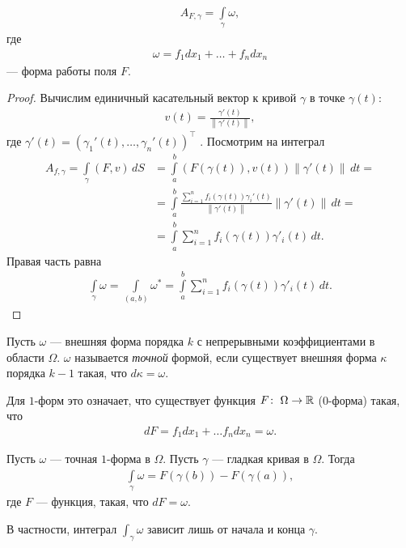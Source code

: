 \begin{claim}
 \begin{align*}
  A_{F,\gamma} = \int\limits_{\gamma} \omega
 ,\end{align*} где
 \begin{align*}
  \omega = f_1 dx_1 + \ldots + f_n dx_n
 \end{align*} --- форма работы поля $F$.
\end{claim}
\begin{proof}
 Вычислим единичный касательный вектор к кривой $\gamma$ в точке $\gamma(t)$:
 \begin{align*}
  v(t) = \frac{\gamma'(t)}{\left\| \gamma'(t) \right\|}
 ,\end{align*} где $\gamma'(t) = (\gamma_1'(t), \ldots, \gamma_n'(t))^{\top}$ . Посмотрим на интеграл
 \begin{align*}
	 A_{f, \gamma} = \int\limits_{\gamma} (F,v) \, dS &= \int\limits_{a}^{b} (F(\gamma(t)), v(t)) \left\| \gamma' (t) \right\| \, dt = \\ 
  &= \int\limits_{a}^{b} \frac{\sum_{i=1}^{n} f_i(\gamma(t))\gamma_i'(t)}{\left\| \gamma'(t) \right\|} \left\| \gamma'(t) \right\| \, dt = \\
  &= \int\limits_{a}^{b} \sum_{i=1}^{n} f_i(\gamma(t))\gamma'_i(t) \, dt 
 .\end{align*} Правая часть равна
 \begin{align*}
  \int\limits_{\gamma} \omega = \int\limits_{(a,b)} \omega^{\ast} = \int\limits_{a}^{b} \sum_{i=1}^{n} f_i(\gamma(t))\gamma'_i(t) \, dt
 .\end{align*} 
\end{proof}
\begin{df}
 Пусть $\omega$ --- внешняя форма порядка $k$ с непрерывными коэффициентами в области $\Omega$. $\omega$ называется \textit{точной} формой, если существует внешняя форма $\kappa$ порядка $k - 1$ такая, что $d \kappa = \omega$.

 Для $1$-форм это означает, что существует функция $F \colon\; \Omega \to \mathbb{R}$ ($0$-форма) такая, что
 \begin{align*}
  dF = f_1 dx_1 + \ldots f_n dx_n = \omega
 .\end{align*} 
\end{df}
\begin{claim}
 \label{claim:integral_of_potential_curve_is_difference_on_ends}
 Пусть $\omega$  --- точная $1$-форма в $\Omega$. Пусть $\gamma$  --- гладкая кривая в $\Omega$. Тогда
 \begin{align*}
  \int\limits_{\gamma} \omega = F(\gamma(b)) - F(\gamma(a))
 ,\end{align*} где $F$ --- функция, такая, что $dF = \omega$.

 В частности, интеграл $\int_{\gamma} \omega  $  зависит лишь от начала и конца $\gamma$.
\end{claim}

